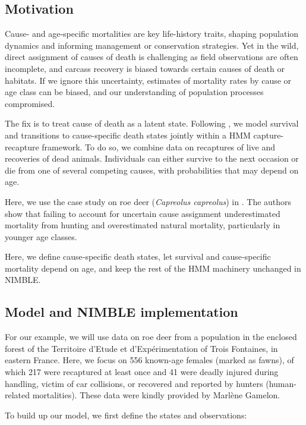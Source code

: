 \documentclass[
  12pt,
]{krantz}
\begin{document}
\subsection{Motivation}\label{motivation-6}

Cause‐ and age-specific mortalities are key life-history traits, shaping population dynamics and informing management or conservation strategies. Yet in the wild, direct assignment of causes of death is challenging as field observations are often incomplete, and carcass recovery is biased towards certain causes of death or habitats. If we ignore this uncertainty, estimates of mortality rates by cause or age class can be biased, and our understanding of population processes compromised.

The fix is to treat cause of death as a latent state. Following \citet{koons2014}, we model survival and transitions to cause-specific death states jointly within a HMM capture-recapture framework. To do so, we combine data on recaptures of live and recoveries of dead animals. Individuals can either survive to the next occasion or die from one of several competing causes, with probabilities that may depend on age.

Here, we use the case study on roe deer (\emph{Capreolus capreolus}) in \citet{koons2014}. The authors show that failing to account for uncertain cause assignment underestimated mortality from hunting and overestimated natural mortality, particularly in younger age classes.

Here, we define cause‐specific death states, let survival and cause‐specific mortality depend on age, and keep the rest of the HMM machinery unchanged in NIMBLE.

\subsection{Model and NIMBLE implementation}\label{model-and-nimble-implementation-6}

For our example, we will use data on roe deer from a population in the enclosed forest of the Territoire d'Etude et d'Expérimentation of Trois Fontaines, in eastern France. Here, we focus on 556 known-age females (marked as fawns), of which 217 were recaptured at least once and 41 were deadly injured during handling, victim of car collisions, or recovered and reported by hunters (human-related mortalities). These data were kindly provided by Marlène Gamelon.

To build up our model, we first define the states and observations:
\end{document}
